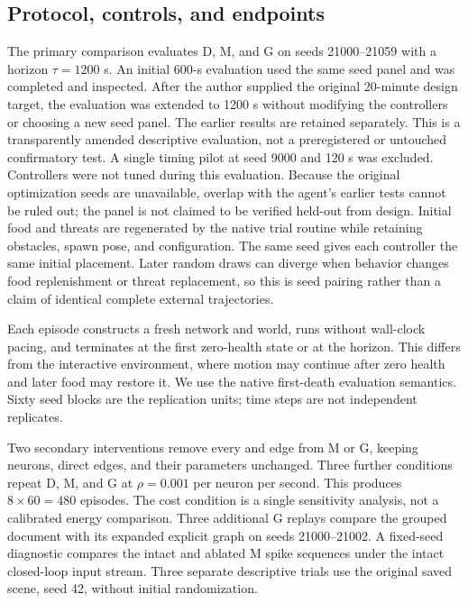 \documentclass[11pt]{article}
\begin{document}
\subsection{Protocol, controls, and endpoints}
The primary comparison evaluates D, M, and G on seeds 21000--21059 with a horizon $\tau=1200$ s. An initial 600-s evaluation used the same seed panel and was completed and inspected. After the author supplied the original 20-minute design target, the evaluation was extended to 1200 s without modifying the controllers or choosing a new seed panel. The earlier results are retained separately. This is a transparently amended descriptive evaluation, not a preregistered or untouched confirmatory test. A single timing pilot at seed 9000 and 120 s was excluded. Controllers were not tuned during this evaluation. Because the original optimization seeds are unavailable, overlap with the agent's earlier tests cannot be ruled out; the panel is not claimed to be verified held-out from design. Initial food and threats are regenerated by the native trial routine while retaining obstacles, spawn pose, and configuration. The same seed gives each controller the same initial placement. Later random draws can diverge when behavior changes food replenishment or threat replacement, so this is seed pairing rather than a claim of identical complete external trajectories.

Each episode constructs a fresh network and world, runs without wall-clock pacing, and terminates at the first zero-health state or at the horizon. This differs from the interactive environment, where motion may continue after zero health and later food may restore it. We use the native first-death evaluation semantics. Sixty seed blocks are the replication units; time steps are not independent replicates.

Two secondary interventions remove every  and  edge from M or G, keeping neurons, direct edges, and their parameters unchanged. Three further conditions repeat D, M, and G at $\rho=0.001$ per neuron per second. This produces $8\times60=480$ episodes. The cost condition is a single sensitivity analysis, not a calibrated energy comparison. Three additional G replays compare the grouped document with its expanded explicit graph on seeds 21000--21002. A fixed-seed diagnostic compares the intact and ablated M spike sequences under the intact closed-loop input stream. Three separate descriptive trials use the original saved scene, seed 42, without initial randomization.
\end{document}
